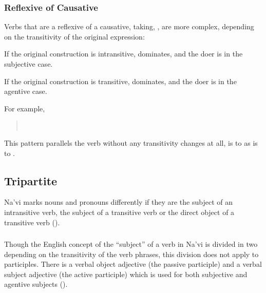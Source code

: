 \subsubsection{Reflexive of Causative}
\label{reflexive-of-causative} 
Verbs that are a reflexive of a causative,
taking, , are more complex, depending on the
transitivity of the original expression:

\begin{itemize*}
  \item If the original construction is intransitive, 
    dominates, and the doer is in the subjective case. 
  \item If the original construction is transitive, 
    dominates, and the doer is in the agentive case. 
\end{itemize*} 

\noindent For example,

\begin{quotation}
\noindent{} \\
\noindent{} 
\end{quotation}

\noindent This pattern parallels the verb without any transitivity
changes at all,  is to  as  is to .

\subsection{Tripartite} Na'vi marks nouns and pronouns differently if
they are the subject of an intransitive verb, the subject of a
transitive verb or the direct object of a transitive verb
().

\subsubsection{} Though the English concept of the ``subject'' of a
verb in Na'vi is divided in two de\-pend\-ing on the transitivity of
the verb phrases, this division does not apply to participles.  There
is a verbal object adjective (the passive participle) and a verbal
subject adjective (the active participle) which is used for both
subjective and agentive subjects ().


